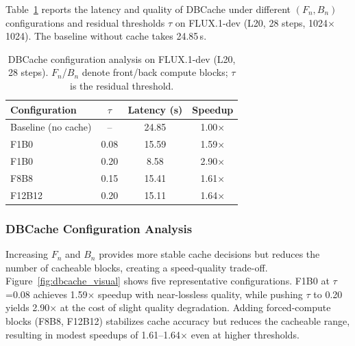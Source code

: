 \documentclass[10pt]{article}
\begin{document}
Table~\ref{tab:dbcache_config} reports the latency and quality of DBCache under different $(F_n, B_n)$ configurations and residual thresholds $\tau$ on FLUX.1-dev (L20, 28 steps, 1024$\times$1024). The baseline without cache takes 24.85\,s.

\begin{table}[htbp]
\centering
\caption{DBCache configuration analysis on FLUX.1-dev (L20, 28 steps). $F_n$/$B_n$ denote front/back compute blocks; $\tau$ is the residual threshold.}
\label{tab:dbcache_config}
\begin{tabular}{lccc}
\toprule
\textbf{Configuration} & \textbf{$\tau$} & \textbf{Latency (s)} & \textbf{Speedup} \\
\midrule
Baseline (no cache) & -- & 24.85 & 1.00$\times$ \\
F1B0 & 0.08 & 15.59 & 1.59$\times$ \\
F1B0 & 0.20 & 8.58  & 2.90$\times$ \\
F8B8 & 0.15 & 15.41 & 1.61$\times$ \\
F12B12 & 0.20 & 15.11 & 1.64$\times$ \\
\bottomrule
\end{tabular}
\end{table}

\subsubsection{DBCache Configuration Analysis}

Increasing $F_n$ and $B_n$ provides more stable cache decisions but reduces the number of cacheable blocks, creating a speed-quality trade-off. Figure~\ref{fig:dbcache_visual} shows five representative configurations. F1B0 at $\tau$=0.08 achieves 1.59$\times$ speedup with near-lossless quality, while pushing $\tau$ to 0.20 yields 2.90$\times$ at the cost of slight quality degradation. Adding forced-compute blocks (F8B8, F12B12) stabilizes cache accuracy but reduces the cacheable range, resulting in modest speedups of 1.61--1.64$\times$ even at higher thresholds.
\end{document}

